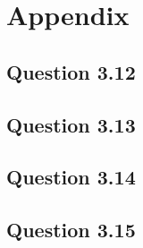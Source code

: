 \documentclass{article}
\begin{document}
\newpage
\appendix

\section{Appendix}
\subsection{Question 3.12}\label{appendix:code.3.12}


\subsection{Question 3.13}\label{appendix:code.3.13}


\subsection{Question 3.14}\label{appendix:code.3.14}


\subsection{Question 3.15}\label{appendix:code.3.15}

\end{document}
